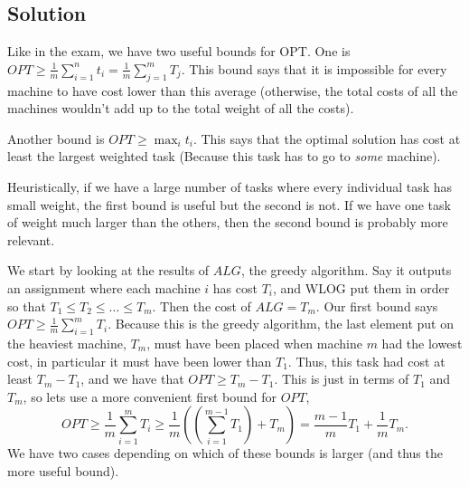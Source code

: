 \documentclass{article}
\begin{document}
\subsection*{Solution}
Like in the exam, we have two useful bounds for OPT. One is $OPT \geq \frac1m \sum_{i = 1}^n t_i=\frac1m \sum_{j=1}^m T_j$. This bound says that it is impossible for every machine to have cost lower than this average (otherwise, the total costs of all the machines wouldn't add up to the total weight of all the costs).

\vspace{3mm}
Another bound is $OPT \geq \max_i t_i$. This says that the optimal solution has cost at least the largest weighted task (Because this task has to go to \emph{some} machine).

\vspace{3mm}
Heuristically, if we have a large number of tasks where every individual task has small weight, the first bound is useful but the second is not. If we have one task of weight much larger than the others, then the second bound is probably more relevant.

\vspace{3mm}
We start by looking at the results of $ALG$, the greedy algorithm. Say it outputs an assignment where each machine $i$ has cost $T_i$, and WLOG put them in order so that $T_1 \leq T_2 \leq \ldots \leq T_m$. Then the cost of $ALG = T_m$. Our first bound says $OPT \geq \frac{1}{m} \sum_{i=1}^m T_i$. Because this is the greedy algorithm, the last element put on the heaviest machine, $T_m$, must have been placed when machine $m$ had the lowest cost, in particular it must have been lower than $T_1$. Thus, this task had cost at least $T_m - T_1$, and we have that $OPT \geq T_m - T_1$. This is just in terms of $T_1$ and $T_m$, so lets use a more convenient first bound for $OPT$, $$OPT \geq \frac{1}{m} \sum_{i=1}^m T_i \geq \frac{1}{m}((\sum_{i=1}^{m-1} T_1) + T_m) = \frac{m-1}{m}T_1 + \frac{1}{m}T_m.$$
We have two cases depending on which of these bounds is larger (and thus the more useful bound).
\end{document}
